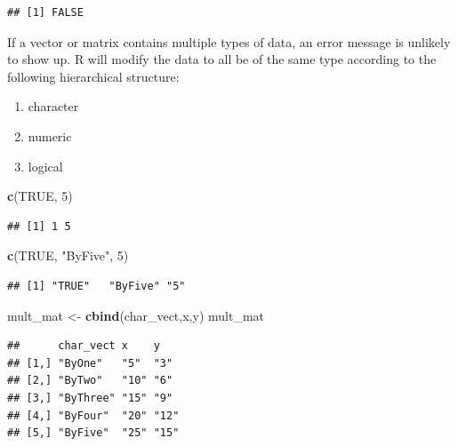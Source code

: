 \documentclass[
]{book}
\newenvironment{Shaded}{\begin{snugshade}}{\end{snugshade}}
\newcommand{\ConstantTok}[1]{\textcolor[rgb]{0.56,0.35,0.01}{#1}}
\newcommand{\DecValTok}[1]{\textcolor[rgb]{0.00,0.00,0.81}{#1}}
\newcommand{\FunctionTok}[1]{\textcolor[rgb]{0.13,0.29,0.53}{\textbf{#1}}}
\newcommand{\NormalTok}[1]{#1}
\newcommand{\OtherTok}[1]{\textcolor[rgb]{0.56,0.35,0.01}{#1}}
\newcommand{\StringTok}[1]{\textcolor[rgb]{0.31,0.60,0.02}{#1}}
\providecommand{\tightlist}{%
  \setlength{\itemsep}{0pt}\setlength{\parskip}{0pt}}
\theoremstyle{definition}
\theoremstyle{definition}
\theoremstyle{definition}
\theoremstyle{definition}
\theoremstyle{remark}
\begin{document}
\begin{verbatim}
## [1] FALSE
\end{verbatim}

If a vector or matrix contains multiple types of data, an error message is unlikely to show up. R will modify the data to all be of the same type according to the following hierarchical structure:

\begin{enumerate}
\def\labelenumi{\arabic{enumi}.}
\tightlist
\item
  character
\item
  numeric\\
\item
  logical
\end{enumerate}

\begin{Shaded}
\begin{Highlighting}[]
\FunctionTok{c}\NormalTok{(}\ConstantTok{TRUE}\NormalTok{, }\DecValTok{5}\NormalTok{)}
\end{Highlighting}
\end{Shaded}

\begin{verbatim}
## [1] 1 5
\end{verbatim}

\begin{Shaded}
\begin{Highlighting}[]
\FunctionTok{c}\NormalTok{(}\ConstantTok{TRUE}\NormalTok{, }\StringTok{"ByFive"}\NormalTok{, }\DecValTok{5}\NormalTok{)}
\end{Highlighting}
\end{Shaded}

\begin{verbatim}
## [1] "TRUE"   "ByFive" "5"
\end{verbatim}

\begin{Shaded}
\begin{Highlighting}[]
\NormalTok{mult\_mat }\OtherTok{\textless{}{-}} \FunctionTok{cbind}\NormalTok{(char\_vect,x,y)}
\NormalTok{mult\_mat}
\end{Highlighting}
\end{Shaded}

\begin{verbatim}
##      char_vect x    y   
## [1,] "ByOne"   "5"  "3" 
## [2,] "ByTwo"   "10" "6" 
## [3,] "ByThree" "15" "9" 
## [4,] "ByFour"  "20" "12"
## [5,] "ByFive"  "25" "15"
\end{verbatim}
\end{document}
